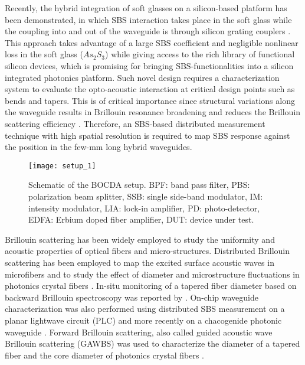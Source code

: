 \documentclass[superscriptaddress, nofootinbib, twocolumn, amsmath,amssymb, aps, pra, notitlepage, longbibliography]{revtex4-1}
\begin{document}
Recently, the hybrid integration of soft glasses on a silicon-based platform has been demonstrated, in which SBS interaction takes place in the soft glass while the coupling into and out of the waveguide is through silicon grating couplers \cite{Morrison2017}. This approach takes advantage of a large SBS coefficient and negligible nonlinear loss in the soft glass ($As_{2}S_{3}$) while giving access to the rich library of functional silicon devices, which is promising for bringing SBS-functionalities into a silicon integrated photonics platform. 
Such novel design requires a characterization system to evaluate the opto-acoustic interaction at critical design points such as bends and tapers. This is of critical importance since structural variations along the waveguide results in Brillouin resonance broadening and reduces the Brillouin scattering efficiency \cite{Wolff2016}. Therefore, an SBS-based distributed measurement technique with high spatial resolution is required to map SBS response against the position in the few-mm long hybrid waveguides.

\begin{figure}[t!]
\centering
\texttt{[image: setup\_1]}
\caption{Schematic of the BOCDA setup. BPF: band pass filter, PBS: polarization beam splitter, SSB: single side-band modulator, IM: intensity modulator, LIA: lock-in amplifier, PD: photo-detector, EDFA: Erbium doped fiber amplifier, DUT: device under test.}
\label{fig:setup_1}
\end{figure}

Brillouin scattering has been widely employed to study the uniformity and acoustic properties of optical fibers and micro-structures. Distributed Brillouin scattering has been employed to map the excited surface acoustic waves in microfibers \cite{Chow2018} and to study the effect of diameter and microstructure fluctuations in photonics crystal fibers \cite{Stiller2010,B.Stiller2012,Beugnot2007}. In-situ monitoring of a tapered fiber diameter based on backward Brillouin spectroscopy was reported by \cite{Godet2017}. On-chip waveguide characterization was also performed using distributed SBS measurement on a planar lightwave circuit (PLC) \cite{Hotate2012} and more recently on a chacogenide photonic waveguide \cite{Zarifi2017}. Forward Brillouin scattering, also called guided acoustic wave Brillouin scattering (GAWBS) was used to characterize the diameter of a tapered fiber \cite{Jarschel2018,Florez2016a,Kang2008} and the core diameter of photonics crystal fibers \cite{Zhong2015a}. 
\end{document}

